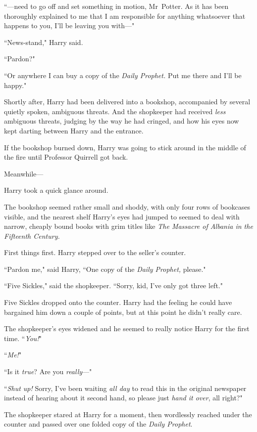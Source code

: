 ``—need to go off and set something in motion, Mr~Potter. As it has been thoroughly explained to me that I am responsible for anything whatsoever that happens to you, I'll be leaving you with—"

``News-stand," Harry said.

``Pardon?"

``Or anywhere I can buy a copy of the \emph{Daily Prophet.} Put me there and I'll be happy."

Shortly after, Harry had been delivered into a bookshop, accompanied by several quietly spoken, ambiguous threats. And the shopkeeper had received \emph{less} ambiguous threats, judging by the way he had cringed, and how his eyes now kept darting between Harry and the entrance.

If the bookshop burned down, Harry was going to stick around in the middle of the fire until Professor Quirrell got back.

Meanwhile—

Harry took a quick glance around.

The bookshop seemed rather small and shoddy, with only four rows of bookcases visible, and the nearest shelf Harry's eyes had jumped to seemed to deal with narrow, cheaply bound books with grim titles like \emph{The Massacre of Albania in the Fifteenth Century.}

First things first. Harry stepped over to the seller's counter.

``Pardon me," said Harry, ``One copy of the \emph{Daily Prophet,} please."

``Five Sickles," said the shopkeeper. ``Sorry, kid, I've only got three left."

Five Sickles dropped onto the counter. Harry had the feeling he could have bargained him down a couple of points, but at this point he didn't really care.

The shopkeeper's eyes widened and he seemed to really notice Harry for the first time. ``\emph{You!}"

``\emph{Me!}"

``Is it \emph{true}? Are you \emph{really}—"

``\emph{Shut up!} Sorry, I've been waiting \emph{all day} to read this in the original newspaper instead of hearing about it second hand, so please just \emph{hand it over}, all right?"

The shopkeeper stared at Harry for a moment, then wordlessly reached under the counter and passed over one folded copy of the \emph{Daily Prophet}.

